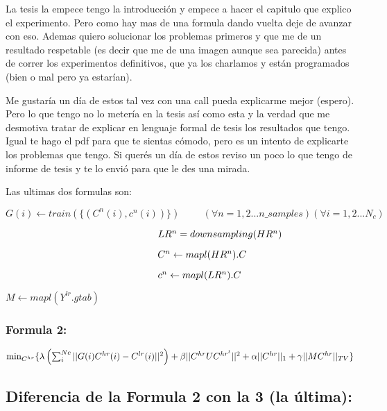 \documentclass[a4paper,10pt]{article}
\title{}
\author{}
\begin{document}
La tesis la empece tengo la introducción y empece a hacer el capitulo que explico el experimento. 
Pero como hay mas de una formula dando vuelta deje de avanzar con eso. 
Ademas quiero solucionar los problemas primeros y que me de un resultado respetable (es decir que me de una 
imagen aunque sea parecida) antes de correr los experimentos definitivos, que ya los charlamos y están programados 
(bien o mal pero ya estarían). 

Me gustaría un día de estos tal vez con una call pueda explicarme mejor (espero). 
Pero lo que tengo no lo metería en la tesis así como esta y la verdad que me desmotiva tratar de explicar en lenguaje 
formal de tesis los resultados que tengo. Igual te hago el pdf para que te sientas cómodo, pero es un intento de explicarte 
los problemas que tengo. Si querés un día de estos reviso un poco lo que tengo de informe de tesis y te lo envió para que le 
des una mirada. 


Las ultimas dos formulas son:

\vspace{1cm}

$ G(i) \leftarrow train(\{(C^n(i), c^n(i))\}) \hspace{1cm}  (\forall n=1,2 ... n\_samples) (\forall i=1,2 ... N_c ) $
 
$ \hspace{5.5cm} LR^n = downsampling(HR^n) $


$ \hspace{5.5cm} C^n  \leftarrow mapl(HR^n).C$

$ \hspace{5.5cm}  c^n \leftarrow mapl(LR^n).C$


$ M \leftarrow mapl(Y^{lr}.gtab) $


\subsubsection*{Formula 2:}%

$\vspace{1cm} \min_{C^{hr}} \{ \lambda  \left( \sum_{i}^{Nc} ||G(i) C^{hr}(i) - C^{lr}(i)||^2 \right) + \beta ||C^{hr}UC^{hr^t}||^2 +\alpha ||C^{hr}||_{1} + \gamma ||MC^{hr}||_{TV}\}$


\subsection*{Diferencia de la Formula 2 con la 3 (la \'ultima):}
\end{document}
